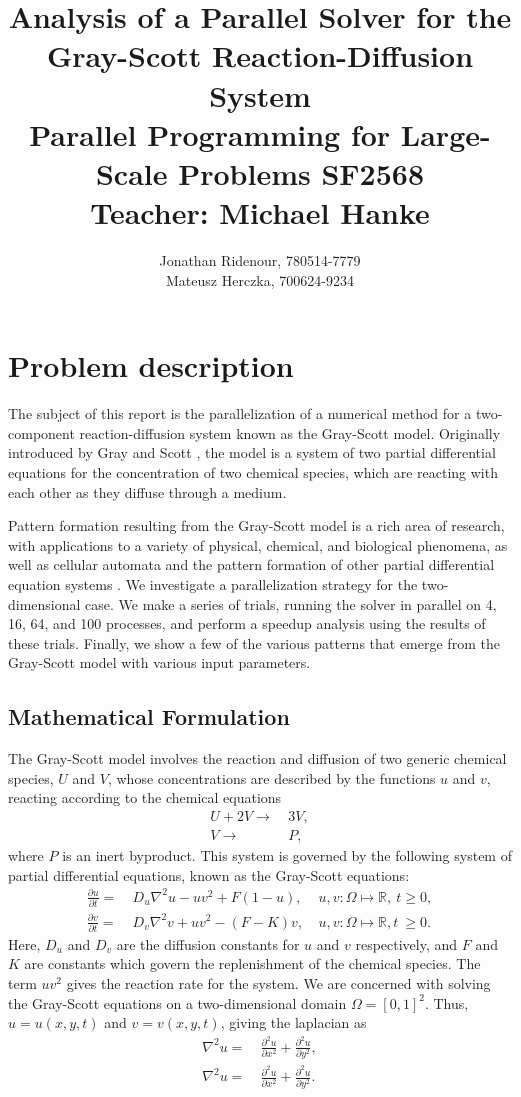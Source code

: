 \documentclass[a4paper,11pt]{article}
\title{ Analysis of a Parallel Solver for the Gray-Scott Reaction-Diffusion System\\ 
\vspace{1.2cm}
\large Parallel Programming for Large-Scale Problems SF2568 \\ 
Teacher: Michael Hanke}
\author{Jonathan Ridenour, 780514-7779\\
Mateusz Herczka, 700624-9234}
\newcommand{\ba}[1]{\begin{align*}    #1    \end{align*}}
\newcommand{\ban}[1]{\begin{align}    #1    \end{align}}
\begin{document}
\maketitle
\pagebreak
\section*{Problem description}
The subject of this report is the parallelization of a numerical method for a two-component reaction-diffusion system known as the Gray-Scott model.  Originally introduced by Gray and Scott \cite{Gray}, the model is a system of two partial differential equations for the concentration of two chemical species, which are reacting with each other as they diffuse through a medium.

Pattern formation resulting from the Gray-Scott model is a rich area of research, with applications to a variety of physical, chemical, and biological phenomena, as well as cellular automata and the pattern formation of other partial differential equation systems \cite{Wang}.  We investigate a parallelization strategy for the two-dimensional case.  We make a series of trials, running the solver in parallel on 4, 16, 64, and 100 processes, and perform a speedup analysis using the results of these trials. Finally, we show a few of the various patterns that emerge from the Gray-Scott model with various input parameters.

\subsection*{Mathematical Formulation}
The Gray-Scott model involves the reaction and diffusion of two generic chemical species, $U$ and $V$, whose concentrations are described by the functions $u$ and $v$, reacting according to the chemical equations
\ba{
U + 2V \rightarrow  & \ 3V,\\
V \rightarrow  & \ P,
}
where $P$ is an inert byproduct.  This system is governed by the following system of partial differential equations, known as the Gray-Scott equations:
\begingroup
\addtolength{\jot}{0.5 em}
\ban{
\label{eq:gsu}
\frac{\partial u}{\partial t} = & \ D_u \nabla^2u - uv^2 + F(1-u), & \ u,v: \Omega \mapsto \mathbb{R}, \ t\ge 0,  \\
\label{eq:gsv}
\frac{\partial v}{\partial t} = & \ D_v \nabla^2v + uv^2 - (F-K)v , & \ u,v: \Omega \mapsto \mathbb{R}, t \ \ge 0.
}
\endgroup
Here, $D_u$ and $D_v$ are the diffusion constants for $u$ and $v$ respectively, and $F$ and $K$ are constants which govern the replenishment of the chemical species.  The term $uv^2$ gives the reaction rate for the system.  We are concerned with solving the Gray-Scott equations on a two-dimensional domain $\Omega = [0,1]^2$.  Thus, $u = u(x,y,t)$ and $v = v(x,y,t)$, giving the laplacian as
\ba{
\nabla^2u = & \ \frac{\partial^2 u}{\partial x^2} + \frac{\partial^2 u}{\partial y^2}, \\
\nabla^2u = & \ \frac{\partial^2 u}{\partial x^2} + \frac{\partial^2 u}{\partial y^2}.
}
\end{document}
